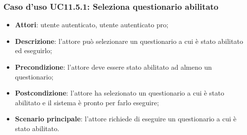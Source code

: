 \subsubsection{Caso d'uso UC11.5.1: Seleziona questionario abilitato}
\begin{itemize}
\item\textbf{Attori}: utente autenticato, utente autenticato pro;
\item\textbf{Descrizione}: l'attore può selezionare un questionario a cui è stato abilitato ed eseguirlo;
\item\textbf{Precondizione}: l'attore deve essere stato abilitato ad almeno un questionario;
\item\textbf{Postcondizione}: l'attore ha selezionato un questionario a cui è stato abilitato e il sistema è pronto per farlo eseguire;
\item\textbf{Scenario principale}: l'attore richiede di eseguire un questionario a cui è stato abilitato.
\end{itemize}